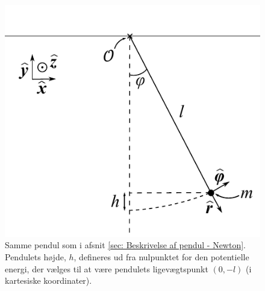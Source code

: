 \begin{figure}[h!]
	\centering
	\includegraphics[width=.5\textwidth]{Analytisk-Mekanik/PendulLagrange.pdf}
	\caption{Samme pendul som i afsnit \ref{sec: Beskrivelse af pendul - Newton}. Pendulets højde, $h$, defineres ud fra nulpunktet for den potentielle energi, der vælges til at være pendulets ligevægtspunkt $(0,-l)$ (i kartesiske koordinater).}
	\label{fig:PendulLagrange}
\end{figure}

